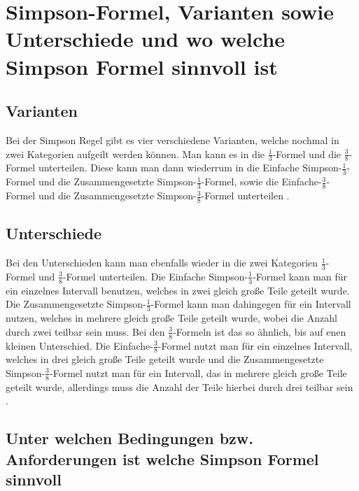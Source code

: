 \chapter{Simpson-Formel, Varianten sowie Unterschiede und wo welche Simpson Formel sinnvoll ist}

\section{Varianten}

Bei der Simpson Regel gibt es vier verschiedene Varianten, welche nochmal in zwei Kategorien aufgeilt werden können. Man kann es in die \(\frac{1}{3}\)-Formel und die \(\frac{3}{8}\)-Formel unterteilen. Diese kann man dann wiederrum in die Einfache Simpson-\(\frac{1}{3}\)-Formel und die Zusammengesetzte Simpson-\(\frac{1}{3}\)-Formel, sowie die Einfache-\(\frac{3}{8}\)-Formel und die Zusammengesetzte Simpson-\(\frac{3}{8}\)-Formel unterteilen \textsc{\cite[S. 342]{SimpsonVarianten}}  \textsc{\cite[S. 327]{BasicNumMath}}.


\section{Unterschiede}\label{Unterschiede}

Bei den Unterschieden kann man ebenfalls wieder in die zwei Kategorien \(\frac{1}{3}\)-Formel und \(\frac{3}{8}\)-Formel unterteilen. Die Einfache Simpson-\(\frac{1}{3}\)-Formel kann man für ein einzelnes Intervall benutzen, welches in zwei gleich große Teile geteilt wurde. Die Zusammengesetzte Simpson-\(\frac{1}{3}\)-Formel kann man dahingegen für ein Intervall nutzen, welches in mehrere gleich große Teile geteilt wurde, wobei die Anzahl durch zwei teilbar sein muss. Bei den \(\frac{3}{8}\)-Formeln ist das so ähnlich, bis auf enen kleinen Unterschied. Die Einfache-\(\frac{3}{8}\)-Formel nutzt man für ein einzelnes Intervall, welches in drei gleich große Teile geteilt wurde und die Zusammengesetzte Simpson-\(\frac{3}{8}\)-Formel nutzt man für ein Intervall, das in mehrere gleich große Teile geteilt wurde, allerdings muss die Anzahl der Teile hierbei durch drei teilbar sein \textsc{\cite[S. 310]{NumMathe}} \textsc{\cite[S. 180]{NumMethodsScienceEng}}.


\section{Unter welchen Bedingungen bzw. Anforderungen ist welche Simpson Formel sinnvoll}

